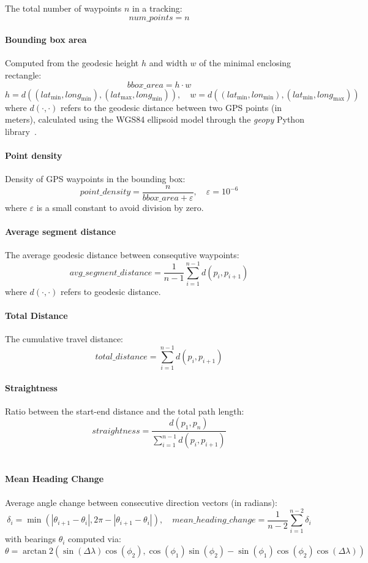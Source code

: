 \documentclass[a4paper,12pt,twoside]{scrreprt}
\begin{document}
The total number of waypoints $n$ in a tracking:
\[
  num\_points = n
\]

\paragraph{Bounding box area}

Computed from the geodesic height $h$ and width $w$ of the minimal enclosing
rectangle:
\[
  bbox\_area = h \cdot w
\]
\[
  h = d((lat_{\min}, long_{\min}), (lat_{\max}, long_{\min})), \quad w =
  d((lat_{\min}, lon_{\min}), (lat_{\min}, long_{\max}))
\]
where $d(\cdot, \cdot)$ refers to the geodesic distance between two GPS points
(in
meters), calculated using the WGS84 ellipsoid model through the \textit{geopy}
Python library~\cite{noauthor_welcome_nodate}.

\paragraph{Point density}

Density of GPS waypoints in the bounding box:
\[
  point\_density = \frac{n}{bbox\_area + \varepsilon}, \quad
  \varepsilon = 10^{-6}
\]
where $\varepsilon$ is a small constant to avoid division by zero.

\paragraph{Average segment distance}

The average geodesic distance between consequtive waypoints:
\[
  avg\_segment\_distance = \frac{1}{n-1} \sum_{i=1}^{n-1} d(p_i, p_{i+1})
\]
where $d(\cdot, \cdot)$ refers to geodesic distance.

\paragraph{Total Distance}
The cumulative travel distance:
\[
  total\_distance = \sum_{i=1}^{n-1} d(p_i, p_{i+1})
\]

\paragraph{Straightness}
Ratio between the start-end distance and the total path length:
\[
  straightness = \frac{d(p_1, p_n)}{\sum_{i=1}^{n-1} d(p_i, p_{i+1})}
\]
~\cite{benhamou_how_2004}

\paragraph{Mean Heading Change}
Average angle change between consecutive direction vectors (in radians):
\[
  \delta_i = \min(|\theta_{i+1} - \theta_i|, 2\pi - |\theta_{i+1} - \theta_i|),
  \quad
  mean\_heading\_change = \frac{1}{n-2} \sum_{i=1}^{n-2} \delta_i
\]
with bearings $\theta_i$ computed via:
\[
  \theta = \arctan2\left( \sin(\Delta \lambda) \cos(\phi_2),
  \cos(\phi_1)\sin(\phi_2) - \sin(\phi_1)\cos(\phi_2)\cos(\Delta \lambda)
  \right)
\]
~\cite{etemad_predicting_2018}
\end{document}
